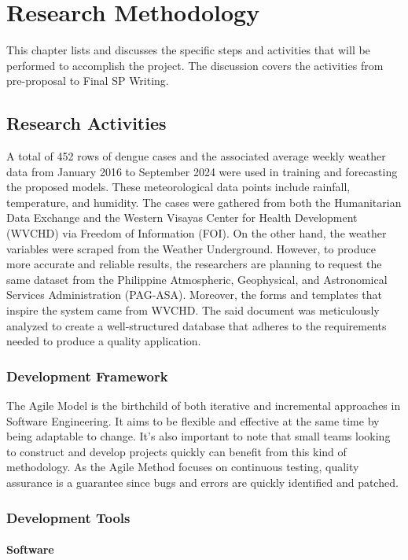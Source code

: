 \chapter{Research Methodology}
This chapter lists and discusses the specific steps and activities that will be performed to accomplish the project. 
The discussion covers the activities from pre-proposal to Final SP Writing.

\section{Research Activities}
A total of 452 rows of dengue cases and the associated average weekly weather data from January 2016 to September 2024 were used in training and forecasting the proposed models. These meteorological data points include rainfall, temperature, and humidity. The cases were gathered from both the Humanitarian Data Exchange and the Western Visayas Center for Health Development (WVCHD) via Freedom of Information (FOI). On the other hand, the weather variables were scraped from the Weather Underground. However, to produce more accurate and reliable results, the researchers are planning to request the same dataset from the Philippine Atmospheric, Geophysical, and Astronomical Services Administration (PAG-ASA).
Moreover, the forms and templates that inspire the system came from WVCHD. The said document was meticulously analyzed to create a well-structured database that adheres to the requirements needed to produce a quality application. 


\subsection{Development Framework}
The Agile Model is the birthchild of both iterative and incremental approaches in Software Engineering. It aims to be flexible and effective at the same time by being adaptable to change. It's also important to note that small teams looking to construct and develop projects quickly can benefit from this kind of methodology. As the Agile Method focuses on continuous testing, quality assurance is a guarantee since bugs and errors are quickly identified and patched. 

\subsection{Development Tools}
\subsubsection{Software}

